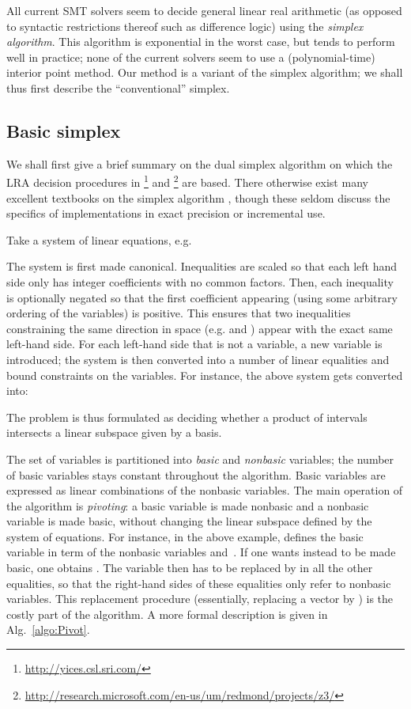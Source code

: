 All current SMT solvers seem to decide general linear real arithmetic (as opposed to syntactic restrictions thereof such as difference logic) using the \emph{simplex algorithm}. This algorithm is exponential in the worst case, but tends to perform well in practice; none of the current solvers seem to use a (polynomial-time) interior point method. Our method is a variant of the simplex algorithm; we shall thus first describe the ``conventional'' simplex.

\subsection{Basic simplex}\label{part:basic_simplex}
We shall first give a brief summary on the dual simplex algorithm on which the LRA decision procedures in \footnote{\url{http://yices.csl.sri.com/}}
\cite{SRI-CSL-06-01,DBLP:conf/cav/DutertreM06} and \footnote{\url{http://research.microsoft.com/en-us/um/redmond/projects/z3/}}
\cite{DBLP:conf/tacas/MouraB08}
are based. There otherwise exist many excellent textbooks on the simplex algorithm \cite{Dantzig1998,Schrijver98}, though these seldom discuss the specifics of implementations in exact precision or incremental use.

Take a system of linear equations, e.g.


The system is first made canonical. Inequalities are scaled so that each left hand side only has integer coefficients with no common factors. Then, each inequality is optionally negated so that the first coefficient appearing (using some arbitrary ordering of the variables) is positive. This ensures that two inequalities constraining the same direction in space (e.g.  and ) appear with the exact same left-hand side. For each left-hand side that is not a variable, a new variable is introduced; the system is then converted into a number of linear equalities and bound constraints on the variables. For instance, the above system gets converted into:

The problem is thus formulated as deciding whether a product of intervals intersects a linear subspace given by a basis.

The set of variables is partitioned into \emph{basic} and \emph{nonbasic} variables; the number of basic variables stays constant throughout the algorithm. Basic variables are expressed as linear combinations of the nonbasic variables. The main operation of the algorithm is \emph{pivoting}: a basic variable is made nonbasic and a nonbasic variable is made basic, without changing the linear subspace defined by the system of equations. For instance, in the above example,  defines the basic variable in term of the nonbasic variables  and~. If one wants instead  to be made basic, one obtains . The variable  then has to be replaced by  in all the other equalities, so that the right-hand sides of these equalities only refer to nonbasic variables. This replacement procedure (essentially, replacing a vector  by ) is the costly part of the algorithm. A more formal description is given in Alg.~\ref{algo:Pivot}.

